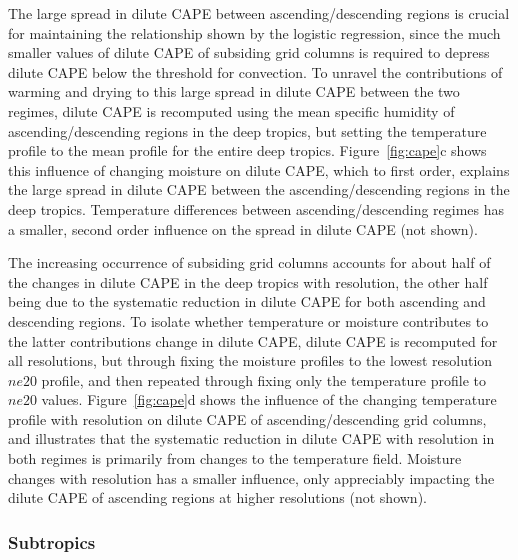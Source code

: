 \documentclass[times]{qjrms4}
\begin{document}
The large spread in dilute CAPE between ascending/descending regions is crucial for maintaining the relationship shown by the logistic regression, since the much smaller values of dilute CAPE of subsiding grid columns is required to depress dilute CAPE below the threshold for convection. To unravel the contributions of warming and drying to this large spread in dilute CAPE between the two regimes, dilute CAPE is recomputed using the mean specific humidity of ascending/descending regions in the deep tropics, but setting the temperature profile to the mean profile for the entire deep tropics. Figure~\ref{fig:cape}c shows this influence of changing moisture on dilute CAPE, which to first order, explains the large spread in dilute CAPE between the ascending/descending regions in the deep tropics. Temperature differences between ascending/descending regimes has a smaller, second order influence on the spread in dilute CAPE (not shown).

The increasing occurrence of subsiding grid columns accounts for about half of the changes in dilute CAPE in the deep tropics with resolution, the other half being due to the systematic reduction in dilute CAPE for both ascending and descending regions. To isolate whether temperature or moisture contributes to the latter contributions change in dilute CAPE, dilute CAPE is recomputed for all resolutions, but through fixing the moisture profiles to the lowest resolution $ne20$ profile, and then repeated through fixing only the temperature profile to $ne20$ values. Figure~\ref{fig:cape}d shows the influence of the changing temperature profile with resolution on dilute CAPE of ascending/descending grid columns, and illustrates that the systematic reduction in dilute CAPE with resolution in both regimes is primarily from changes to the temperature field. Moisture changes with resolution has a smaller influence, only appreciably impacting the dilute CAPE of ascending regions at higher resolutions (not shown).

\subsubsection{Subtropics}
\end{document}
